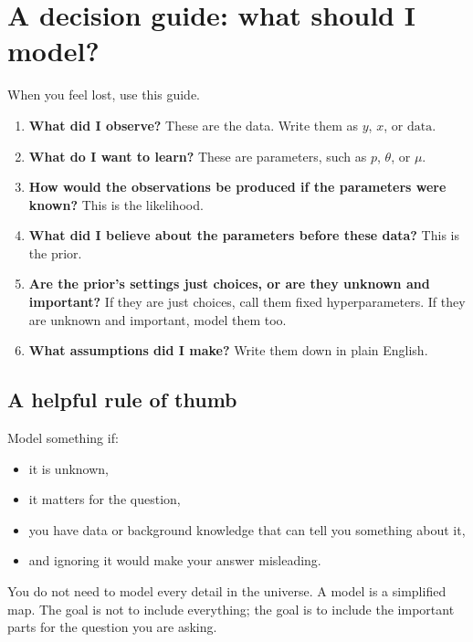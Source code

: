 \documentclass[11pt]{article}
\newcommand{\data}{\text{data}}
\begin{document}
\section{A decision guide: what should I model?}

When you feel lost, use this guide.

\begin{recipebox}
\begin{enumerate}[leftmargin=1.5em]
  \item \textbf{What did I observe?} These are the data. Write them as $y$, $x$, or $\data$.
  \item \textbf{What do I want to learn?} These are parameters, such as $p$, $\theta$, or $\mu$.
  \item \textbf{How would the observations be produced if the parameters were known?} This is the likelihood.
  \item \textbf{What did I believe about the parameters before these data?} This is the prior.
  \item \textbf{Are the prior's settings just choices, or are they unknown and important?} If they are just choices, call them fixed hyperparameters. If they are unknown and important, model them too.
  \item \textbf{What assumptions did I make?} Write them down in plain English.
\end{enumerate}
\end{recipebox}

\subsection*{A helpful rule of thumb}

Model something if:

\begin{itemize}[leftmargin=1.5em]
  \item it is unknown,
  \item it matters for the question,
  \item you have data or background knowledge that can tell you something about it,
  \item and ignoring it would make your answer misleading.
\end{itemize}

You do not need to model every detail in the universe. A model is a simplified map. The goal is not to include everything; the goal is to include the important parts for the question you are asking.
\end{document}
